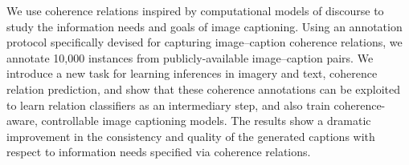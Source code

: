 We use coherence relations inspired by computational models of discourse to study the information needs and goals of image captioning. Using an annotation protocol specifically devised for capturing image--caption coherence relations, we annotate 10,000 instances from publicly-available image--caption pairs. We introduce a new task for learning inferences in imagery and text, coherence relation prediction, and show that these coherence annotations can be exploited to learn relation classifiers as an intermediary step, and also train coherence-aware, controllable image captioning models. The results show a dramatic improvement in the consistency and quality of the generated captions with respect to information needs specified via coherence relations.
